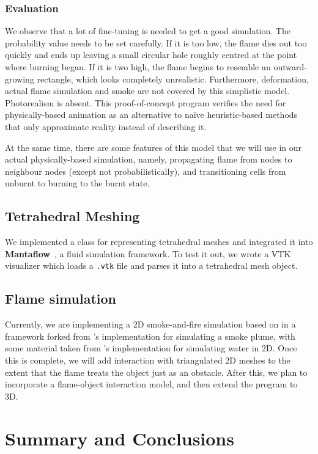 \documentclass[12pt]{report}
\begin{document}
\subsection{Evaluation}

We observe that a lot of fine-tuning is needed to get a good simulation. The probability value needs to be set carefully. If it is too low, the flame dies out too quickly and ends up leaving a small circular hole roughly centred at the point where burning began. If it is two high, the flame begins to resemble an outward-growing rectangle, which looks completely unrealistic. Furthermore, deformation, actual flame simulation and smoke are not covered by this simplistic model. Photorealism is absent. This proof-of-concept program verifies the need for physically-based animation as an alternative to na\"ive heuristic-based methods that only approximate reality instead of describing it.

At the same time, there are some features of this model that we will use in our actual physically-based simulation, namely, propagating flame from nodes to neighbour nodes (except not probabilistically), and transitioning cells from unburnt to burning to the burnt state.

\section{Tetrahedral Meshing}

We implemented a class for representing tetrahedral meshes and integrated it into \textbf{Mantaflow}~\cite{mantaflow}, a fluid simulation framework. To test it out, we wrote a VTK visualizer which loads a \texttt{.vtk} file and parses it into a tetrahedral mesh object.

\section{Flame simulation}

Currently, we are implementing a 2D smoke-and-fire simulation based on \cite{ngfeje} in a framework forked from \cite{caltech}'s implementation for simulating a smoke plume, with some material taken from \cite{harsha}'s implementation for simulating water in 2D. Once this is complete, we will add interaction with triangulated 2D meshes to the extent that the flame treats the object just as an obstacle. After this, we plan to incorporate a flame-object interaction model, and then extend the program to 3D.

\chapter{Summary and Conclusions}
\end{document}
